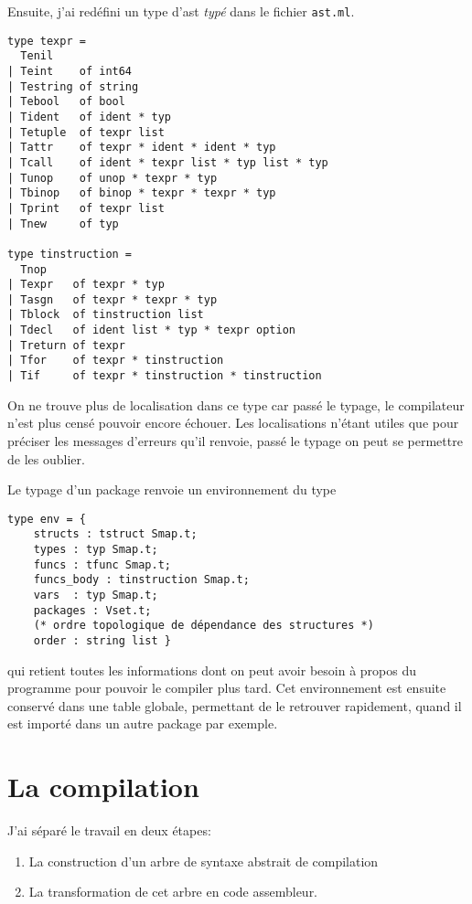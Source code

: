 \documentclass{article}
\begin{document}
Ensuite, j'ai redéfini un type d'ast \textit{typé} dans le fichier \texttt{ast.ml}.

\begin{verbatim}
type texpr =
  Tenil
| Teint    of int64
| Testring of string
| Tebool   of bool
| Tident   of ident * typ
| Tetuple  of texpr list
| Tattr    of texpr * ident * ident * typ
| Tcall    of ident * texpr list * typ list * typ
| Tunop    of unop * texpr * typ
| Tbinop   of binop * texpr * texpr * typ
| Tprint   of texpr list
| Tnew     of typ

type tinstruction =
  Tnop
| Texpr   of texpr * typ
| Tasgn   of texpr * texpr * typ
| Tblock  of tinstruction list
| Tdecl   of ident list * typ * texpr option
| Treturn of texpr
| Tfor    of texpr * tinstruction
| Tif     of texpr * tinstruction * tinstruction
\end{verbatim}

On ne trouve plus de localisation dans ce type car passé le typage, le compilateur n'est plus censé pouvoir encore échouer. Les localisations n'étant utiles que pour préciser les messages d'erreurs qu'il renvoie, passé le typage on peut se permettre de les oublier.

Le typage d'un package renvoie un environnement du type

\begin{verbatim}
type env = {
    structs : tstruct Smap.t;
    types : typ Smap.t;
    funcs : tfunc Smap.t;
    funcs_body : tinstruction Smap.t;
    vars  : typ Smap.t;
    packages : Vset.t;
    (* ordre topologique de dépendance des structures *)
    order : string list }
\end{verbatim}

qui retient toutes les informations dont on peut avoir besoin à propos du programme pour pouvoir le compiler plus tard. Cet environnement est ensuite conservé dans une table globale, permettant de le retrouver rapidement, quand il est importé dans un autre package par exemple.

\section{La compilation}

J'ai séparé le travail en deux étapes:
\begin{enumerate}
\item La construction d'un arbre de syntaxe abstrait de compilation
\item La transformation de cet arbre en code assembleur.
\end{enumerate}
\end{document}
